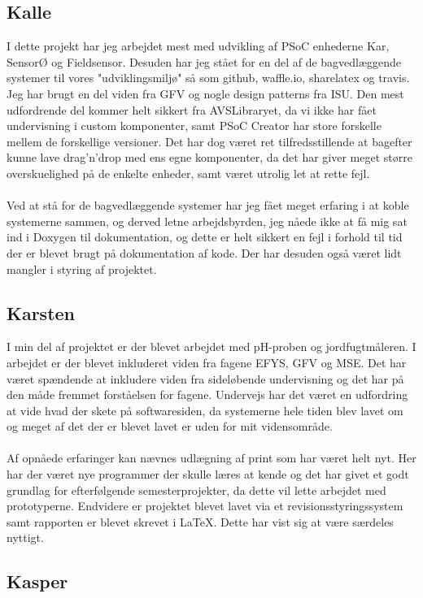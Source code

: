 \subsection{Kalle}
I dette projekt har jeg arbejdet mest med udvikling af PSoC enhederne Kar, SensorØ og Fieldsensor. Desuden har jeg  stået for en del af de bagvedlæggende systemer til vores "udviklingsmiljø" så som github, waffle.io, sharelatex og travis. Jeg har brugt en del viden fra GFV og nogle design patterns fra ISU. Den mest udfordrende del kommer helt sikkert fra AVSLibraryet, da vi ikke har fået undervisning i custom komponenter, samt PSoC Creator har store forskelle mellem de forskellige versioner. Det har dog været ret tilfredsstillende at bagefter kunne lave drag'n'drop med ens egne komponenter, da det har giver meget større overskuelighed på de enkelte enheder, samt været utrolig let at rette fejl.\\\\
Ved at stå for de bagvedlæggende systemer har jeg fået meget erfaring i at koble systemerne sammen, og derved letne arbejdsbyrden, jeg nåede ikke at få mig sat ind i Doxygen til dokumentation, og dette er helt sikkert en fejl i forhold til tid der er blevet brugt på dokumentation af kode. Der har desuden også været lidt mangler i styring af projektet. 

\subsection{Karsten}
I min del af projektet er der blevet arbejdet med pH-proben og jordfugtmåleren. I arbejdet er der blevet inkluderet viden fra fagene EFYS, GFV og MSE. Det har været spændende at inkludere viden fra sideløbende undervisning og det har på den måde fremmet forståelsen for fagene. Undervejs har det været en udfordring at vide hvad der skete på softwaresiden, da systemerne hele tiden blev lavet om og meget af det der er blevet lavet er uden for mit vidensområde.
\\\\
Af opnåede erfaringer kan nævnes udlægning af print som har været helt nyt. Her har der været nye programmer der skulle læres at kende og det har givet et godt grundlag for efterfølgende semesterprojekter, da dette vil lette arbejdet med prototyperne. Endvidere er projektet blevet lavet via et revisionsstyringssystem samt rapporten er blevet skrevet i LaTeX. Dette har vist sig at være særdeles nyttigt. 
\subsection{Kasper}

